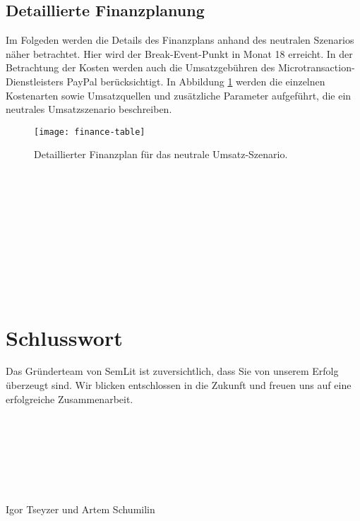 \subsection{Detaillierte Finanzplanung}
Im Folgeden werden die Details des Finanzplans anhand des neutralen Szenarios näher betrachtet. Hier wird der Break-Event-Punkt in Monat 18 erreicht. In der Betrachtung der Kosten werden auch die Umsatzgebühren des Microtransaction-Dienstleisters PayPal berücksichtigt. In Abbildung \ref{fig:financials2} werden die einzelnen Kostenarten sowie Umsatzquellen und zusätzliche Parameter aufgeführt, die ein neutrales Umsatzszenario beschreiben. 
\begin{figure}[h!]
\centering
\texttt{[image: finance-table]}
\caption{Detaillierter Finanzplan für das neutrale Umsatz-Szenario.}
\label{fig:financials2}
\end{figure}
\\
\\
\\
\\
\\
\\
\\
\\
\\
\section{Schlusswort}
Das Gründerteam von SemLit ist zuversichtlich, dass Sie von unserem Erfolg überzeugt sind. Wir blicken entschlossen in die Zukunft und freuen uns auf eine erfolgreiche Zusammenarbeit. 
\\
\\
\\
\\
\\
\\
\\
\\
Igor Tseyzer und Artem Schumilin
